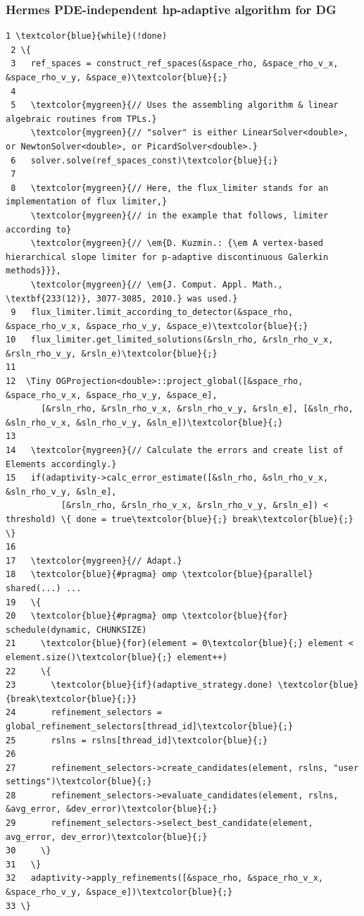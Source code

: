 \documentclass{beamer}
\begin{document}
\begin{frame}[fragile]
\frametitle{Hermes PDE-independent hp-adaptive algorithm for DG}
\begin{Verbatim}[commandchars=\\\{\}, fontsize=\Tinyc]
 1 \textcolor{blue}{while}(!done)
 2 \{
 3   ref_spaces = construct_ref_spaces(&space_rho, &space_rho_v_x, &space_rho_v_y, &space_e)\textcolor{blue}{;}
 4
 5   \textcolor{mygreen}{// Uses the assembling algorithm & linear algebraic routines from TPLs.}
     \textcolor{mygreen}{// "solver" is either LinearSolver<double>, or NewtonSolver<double>, or PicardSolver<double>.}
 6   solver.solve(ref_spaces_const)\textcolor{blue}{;}
 7   
 8   \textcolor{mygreen}{// Here, the flux_limiter stands for an implementation of flux limiter,}
     \textcolor{mygreen}{// in the example that follows, limiter according to}
     \textcolor{mygreen}{// \em{D. Kuzmin.: {\em A vertex-based hierarchical slope limiter for p-adaptive discontinuous Galerkin methods}}}, 
     \textcolor{mygreen}{// \em{J. Comput. Appl. Math., \textbf{233(12)}, 3077-3085, 2010.} was used.}
 9   flux_limiter.limit_according_to_detector(&space_rho, &space_rho_v_x, &space_rho_v_y, &space_e)\textcolor{blue}{;}
10   flux_limiter.get_limited_solutions(&rsln_rho, &rsln_rho_v_x, &rsln_rho_v_y, &rsln_e)\textcolor{blue}{;}
11
12  \Tiny OGProjection<double>::project_global([&space_rho, &space_rho_v_x, &space_rho_v_y, &space_e],
       [&rsln_rho, &rsln_rho_v_x, &rsln_rho_v_y, &rsln_e], [&sln_rho, &sln_rho_v_x, &sln_rho_v_y, &sln_e])\textcolor{blue}{;}
13
14   \textcolor{mygreen}{// Calculate the errors and create list of Elements accordingly.}
15   if(adaptivity->calc_error_estimate([&sln_rho, &sln_rho_v_x, &sln_rho_v_y, &sln_e],
           [&rsln_rho, &rsln_rho_v_x, &rsln_rho_v_y, &rsln_e]) < threshold) \{ done = true\textcolor{blue}{;} break\textcolor{blue}{;} \}
16 
17   \textcolor{mygreen}{// Adapt.}
18   \textcolor{blue}{#pragma} omp \textcolor{blue}{parallel} shared(...) ...
19   \{
20   \textcolor{blue}{#pragma} omp \textcolor{blue}{for} schedule(dynamic, CHUNKSIZE)
21     \textcolor{blue}{for}(element = 0\textcolor{blue}{;} element < element.size()\textcolor{blue}{;} element++)
22     \{
23       \textcolor{blue}{if}(adaptive_strategy.done) \textcolor{blue}{break\textcolor{blue}{;}}
24       refinement_selectors = global_refinement_selectors[thread_id]\textcolor{blue}{;}
25       rslns = rslns[thread_id]\textcolor{blue}{;}
26       
27       refinement_selectors->create_candidates(element, rslns, "user settings")\textcolor{blue}{;}
28       refinement_selectors->evaluate_candidates(element, rslns, &avg_error, &dev_error)\textcolor{blue}{;}
29       refinement_selectors->select_best_candidate(element, avg_error, dev_error)\textcolor{blue}{;}
30     \}
31   \}
32   adaptivity->apply_refinements([&space_rho, &space_rho_v_x, &space_rho_v_y, &space_e])\textcolor{blue}{;}
33 \}
\end{Verbatim}
\end{frame}
\end{document}
